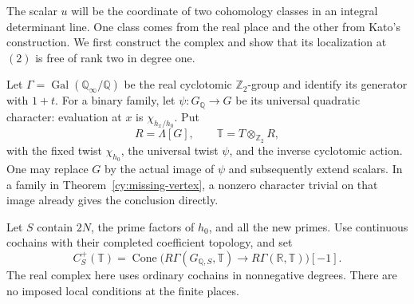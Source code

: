 The scalar $u$ will be the coordinate of two cohomology classes in an
integral determinant line.  One class comes from the real place and the
other from Kato's construction.  We first construct the complex and show
that its localization at $(2)$ is free of rank two in degree one.

Let $\Gamma=\operatorname{Gal}(\mathbb Q_\infty/\mathbb Q)$ be the real
cyclotomic $\mathbb Z _2$-group and identify its generator with $1+t$.
For a binary family, let $\psi:G_{\mathbb Q}\to G$ be its universal
quadratic character: evaluation at $x$ is $\chi_{h_x/h_0}$.  Put
\[
 R=\Lambda[G],\qquad
 \mathbb T=T\otimes_{\mathbb Z _2}R,
\]
with the fixed twist $\chi_{h_0}$, the universal twist $\psi$, and the
inverse cyclotomic action.  One may replace $G$ by the actual image of
$\psi$ and subsequently extend scalars.  In a family in
Theorem~\ref{cy:missing-vertex}, a nonzero character trivial on that image
already gives the conclusion directly.

Let $S$ contain $2N$, the prime factors of $h_0$, and all the new primes.
Use continuous cochains with their completed coefficient topology, and set
\begin{equation}\label{cy:positive}
 C_S^+(\mathbb T)=
 \operatorname{Cone}\bigl(R\Gamma(G_{\mathbb Q,S},\mathbb T)
              \longrightarrow R\Gamma(\mathbb R,\mathbb T)\bigr)[-1].
\end{equation}
The real complex here uses ordinary cochains in nonnegative degrees.
There are no imposed local conditions at the finite places.

